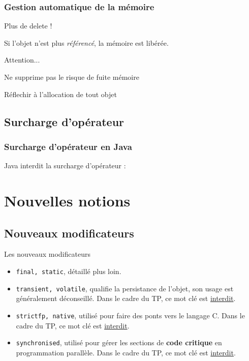 \documentclass[handout]{beamer}
\begin{document}
\begin{frame}
	\frametitle{Gestion automatique de la mémoire}
	\begin{block}{Plus de delete !}
	\end{block}
	Si l'objet n'est plus \textit{référencé}, la mémoire est libérée. 
	\begin{block}{Attention...}
		{\color{red}
			\begin{center}
				\item Ne supprime pas le risque de fuite mémoire
				\item Réflechir à l'allocation de tout objet
			\end{center}

		}	
	\end{block}
\end{frame}

\subsection{Surcharge d'opérateur}

\begin{frame}
	\frametitle{Surcharge d'opérateur en Java}
	\begin{block}{Java interdit la surcharge d'opérateur :}
	\end{block}

	
\end{frame}

\section{Nouvelles notions}

\subsection{Nouveaux modificateurs}
\begin{frame}
	\begin{block}{Les nouveaux modificateurs}
		\begin{itemize}
			\item \texttt{final, static}, détaillé plus loin.
			\item \texttt{transient, volatile}, qualifie la persistance de l'objet, son usage est  généralement déconseillé. Dans le cadre du TP, ce mot clé est \underline{interdit}.
			\item \texttt{strictfp, native}, utilisé pour faire des ponts vers le langage C. Dans le cadre du TP, ce mot clé est \underline{interdit}.
			\item \texttt{synchronised}, utilisé pour gérer les sections de \textbf{code critique} en programmation parallèle. Dans le cadre du TP, ce mot clé est \underline{interdit}.
		\end{itemize}
	\end{block}
	
\end{frame}
\end{document}
